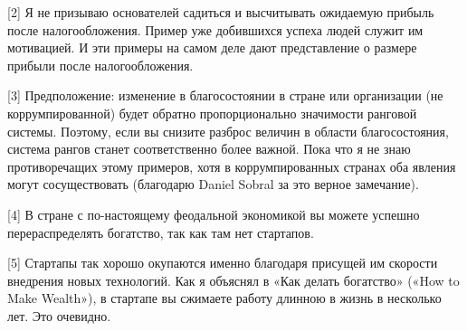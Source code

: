 \documentclass[ebook,12pt,oneside,openany]{memoir}
\begin{document}
[2] Я не призываю основателей садиться и высчитывать ожидаемую прибыль
после налогообложения. Пример уже добившихся успеха людей служит им
мотивацией. И эти примеры на самом деле дают представление о размере
прибыли после налогообложения.

[3] Предположение: изменение в благосостоянии в стране или организации
(не коррумпированной) будет обратно пропорционально значимости
ранговой системы. Поэтому, если вы снизите разброс величин в области
благосостояния, система рангов станет соответственно более важной.
Пока что я не знаю противоречащих этому примеров, хотя в
коррумпированных странах оба явления могут сосуществовать (благодарю
Daniel Sobral за это верное замечание).

[4] В стране с по-настоящему феодальной экономикой вы можете успешно
перераспределять богатство, так как там нет стартапов.

[5] Стартапы так хорошо окупаются именно благодаря присущей им
скорости внедрения новых технологий. Как я объяснял в «Как делать
богатство» («How to Make Wealth»), в стартапе вы сжимаете работу
длинною в жизнь в несколько лет. Это очевидно.
\end{document}
